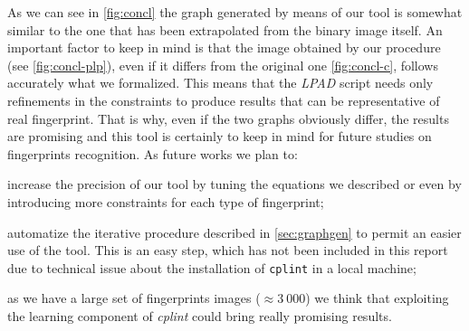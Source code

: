 \documentclass[8pt]{article}
\begin{document}
As we can see in \cref{fig:concl} the graph generated by means of our tool is
somewhat similar to the one that has been extrapolated from the binary image
itself.  An important factor to keep in mind is that the image obtained by our
procedure (see \cref{fig:concl-plp}), even if it differs from the original one
\cref{fig:concl-c}, follows accurately what we formalized.  This means that the
\textit{LPAD} script needs only refinements in the constraints to produce
results that can be representative of real fingerprint.  That is why, even if
the two graphs obviously differ, the results are promising and this tool is
certainly to keep in mind for future studies on fingerprints recognition.
As future works we plan to:
\begin{enumerate*}[label=\roman*)]
  \item increase the precision of our tool by tuning the equations we described
        or even by introducing more constraints for each type of fingerprint;
  \item automatize the iterative procedure described in
        \cref{sec:graphgen} to permit an easier use of the tool.  This is an
        easy step, which has not been included in this report due to technical
        issue about the installation of \texttt{cplint} in a local machine;
	\item as we have a large set of fingerprints images ($\approx 3\ 000$) we think that 
        exploiting the learning component of \textit{cplint} could bring really promising results.
\end{enumerate*}





\end{document}
